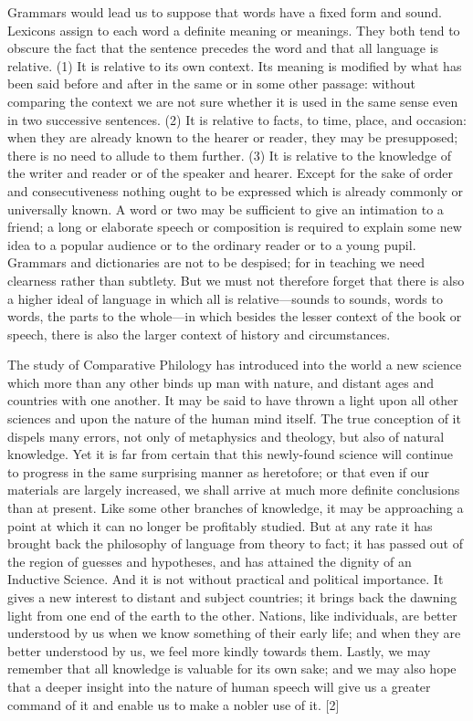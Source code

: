 \documentclass[11pt,letter]{article}
\begin{document}
\par  Grammars would lead us to suppose that words have a fixed form and sound. Lexicons assign to each word a definite meaning or meanings. They both tend to obscure the fact that the sentence precedes the word and that all language is relative. (1) It is relative to its own context. Its meaning is modified by what has been said before and after in the same or in some other passage: without comparing the context we are not sure whether it is used in the same sense even in two successive sentences. (2) It is relative to facts, to time, place, and occasion: when they are already known to the hearer or reader, they may be presupposed; there is no need to allude to them further. (3) It is relative to the knowledge of the writer and reader or of the speaker and hearer. Except for the sake of order and consecutiveness nothing ought to be expressed which is already commonly or universally known. A word or two may be sufficient to give an intimation to a friend; a long or elaborate speech or composition is required to explain some new idea to a popular audience or to the ordinary reader or to a young pupil. Grammars and dictionaries are not to be despised; for in teaching we need clearness rather than subtlety. But we must not therefore forget that there is also a higher ideal of language in which all is relative—sounds to sounds, words to words, the parts to the whole—in which besides the lesser context of the book or speech, there is also the larger context of history and circumstances.

\par  The study of Comparative Philology has introduced into the world a new science which more than any other binds up man with nature, and distant ages and countries with one another. It may be said to have thrown a light upon all other sciences and upon the nature of the human mind itself. The true conception of it dispels many errors, not only of metaphysics and theology, but also of natural knowledge. Yet it is far from certain that this newly-found science will continue to progress in the same surprising manner as heretofore; or that even if our materials are largely increased, we shall arrive at much more definite conclusions than at present. Like some other branches of knowledge, it may be approaching a point at which it can no longer be profitably studied. But at any rate it has brought back the philosophy of language from theory to fact; it has passed out of the region of guesses and hypotheses, and has attained the dignity of an Inductive Science. And it is not without practical and political importance. It gives a new interest to distant and subject countries; it brings back the dawning light from one end of the earth to the other. Nations, like individuals, are better understood by us when we know something of their early life; and when they are better understood by us, we feel more kindly towards them. Lastly, we may remember that all knowledge is valuable for its own sake; and we may also hope that a deeper insight into the nature of human speech will give us a greater command of it and enable us to make a nobler use of it. [2]
\end{document}

